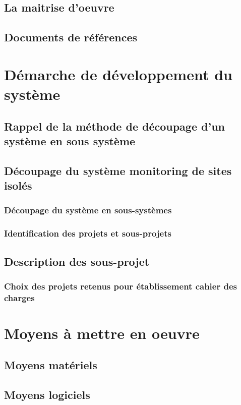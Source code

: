 \subsection{La maitrise d'oeuvre}
\subsection{Documents de références}
\section{Démarche de développement du système}

\subsection{Rappel de la méthode de découpage d'un système en sous système}

\subsection{Découpage du système monitoring de sites isolés}
\subsubsection{Découpage du système en sous-systèmes}
\subsubsection{Identification des projets et sous-projets}
\subsection{Description des sous-projet}
\subsubsection{Choix des projets retenus pour établissement cahier des charges}

\section{Moyens à mettre en oeuvre}
\subsection{Moyens matériels}
\subsection{Moyens logiciels}

